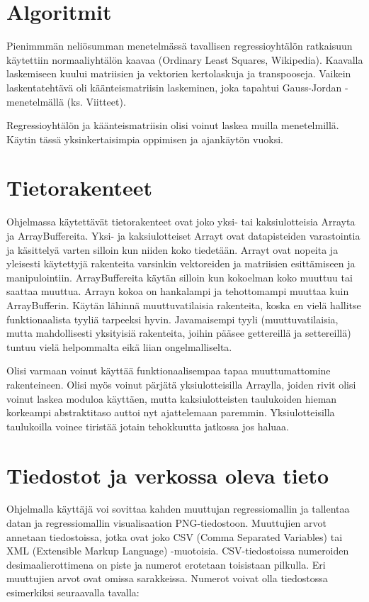 \documentclass{article}
\begin{document}
    

\section{Algoritmit}
    
    Pienimmmän neliösumman menetelmässä tavallisen regressioyhtälön ratkaisuun käytettiin 
	normaaliyhtälön kaavaa (Ordinary Least Squares, Wikipedia). Kaavalla laskemiseen kuului matriisien ja vektorien kertolaskuja ja transpooseja. Vaikein laskentatehtävä oli käänteismatriisin laskeminen, joka tapahtui Gauss-Jordan -menetelmällä (ks. Viitteet).
	
	Regressioyhtälön ja käänteismatriisin olisi voinut laskea muilla menetelmillä. Käytin
	tässä yksinkertaisimpia oppimisen ja ajankäytön vuoksi.

\section{Tietorakenteet}

	Ohjelmassa käytettävät tietorakenteet ovat joko yksi- tai kaksiulotteisia Arrayta ja 
	ArrayBuffereita. Yksi- ja kaksiulotteiset Arrayt ovat datapisteiden varastointia ja 
	käsittelyä varten silloin kun niiden koko tiedetään. Arrayt ovat nopeita ja yleisesti
	käytettyjä rakenteita varsinkin vektoreiden ja matriisien esittämiseen ja manipulointiin.
	ArrayBuffereita käytän silloin kun kokoelman koko muuttuu tai saattaa muuttua. Arrayn
	kokoa on hankalampi ja tehottomampi muuttaa kuin ArrayBufferin. Käytän lähinnä 
	muuttuvatilaisia rakenteita, koska en vielä hallitse funktionaalista tyyliä tarpeeksi
	hyvin. Javamaisempi tyyli (muuttuvatilaisia, mutta mahdollisesti yksityisiä rakenteita,
	joihin pääsee gettereillä ja settereillä) tuntuu vielä helpommalta eikä liian ongelmalliselta.
	
	Olisi varmaan voinut käyttää funktionaalisempaa tapaa muuttumattomine rakenteineen.
	Olisi myös voinut pärjätä yksiulotteisilla Arraylla, joiden rivit olisi voinut laskea
	moduloa käyttäen, mutta kaksiulotteisten taulukoiden hieman korkeampi abstraktitaso auttoi
	nyt ajattelemaan paremmin. Yksiulotteisilla taulukoilla voinee tiristää jotain tehokkuutta
	jatkossa jos haluaa.
    

\section{Tiedostot ja verkossa oleva tieto}

    Ohjelmalla käyttäjä voi sovittaa kahden muuttujan regressiomallin ja tallentaa datan ja 
	regressiomallin visualisaation PNG-tiedostoon. Muuttujien arvot annetaan tiedostoissa, 
	jotka ovat joko CSV (Comma Separated Variables) tai XML (Extensible Markup Language) 
	-muotoisia. CSV-tiedostoissa numeroiden desimaalierottimena on piste ja numerot erotetaan 
	toisistaan pilkulla. Eri muuttujien arvot ovat omissa sarakkeissa. Numerot voivat olla 
	tiedostossa esimerkiksi seuraavalla tavalla: \\
    
\end{document}
